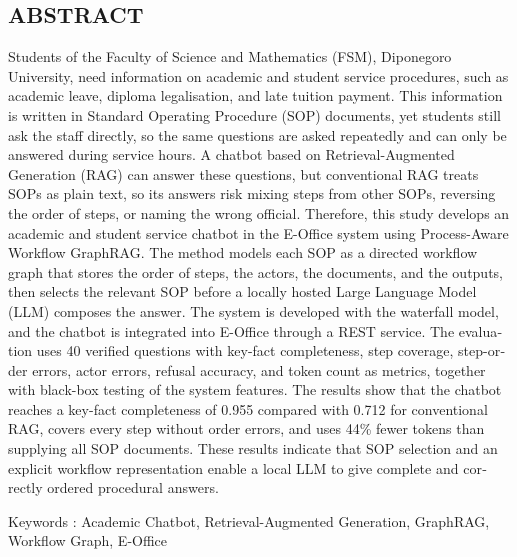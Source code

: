\begin{otherlanguage}{american}
\chapter*{ABSTRACT}
\begingroup{}\setlength{\parindent}{0pt}
Students of the Faculty of Science and Mathematics (FSM), Diponegoro University, need information on academic and student service procedures, such as academic leave, diploma legalisation, and late tuition payment. This information is written in Standard Operating Procedure (SOP) documents, yet students still ask the staff directly, so the same questions are asked repeatedly and can only be answered during service hours. A chatbot based on Retrieval-Augmented Generation (RAG) can answer these questions, but conventional RAG treats SOPs as plain text, so its answers risk mixing steps from other SOPs, reversing the order of steps, or naming the wrong official. Therefore, this study develops an academic and student service chatbot in the E-Office system using Process-Aware Workflow GraphRAG. The method models each SOP as a directed workflow graph that stores the order of steps, the actors, the documents, and the outputs, then selects the relevant SOP before a locally hosted Large Language Model (LLM) composes the answer. The system is developed with the waterfall model, and the chatbot is integrated into E-Office through a REST service. The evaluation uses 40 verified questions with key-fact completeness, step coverage, step-order errors, actor errors, refusal accuracy, and token count as metrics, together with black-box testing of the system features. The results show that the chatbot reaches a key-fact completeness of 0.955 compared with 0.712 for conventional RAG, covers every step without order errors, and uses 44\% fewer tokens than supplying all SOP documents. These results indicate that SOP selection and an explicit workflow representation enable a local LLM to give complete and correctly ordered procedural answers.

\vspace{12pt}
\noindent Keywords : Academic Chatbot, Retrieval-Augmented Generation, GraphRAG, Workflow Graph, E-Office
\par\endgroup
\end{otherlanguage}
\clearpage
